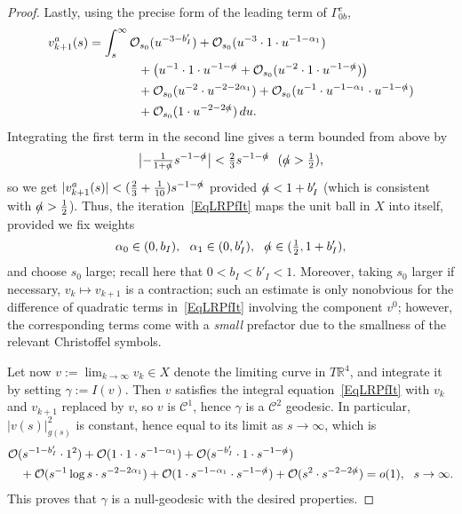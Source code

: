 \documentclass[reqno,11pt,letterpaper]{amsart}
\numberwithin{equation}{section}
\numberwithin{figure}{section}
\theoremstyle{definition}
\theoremstyle{remark}
\newcommand{\mc}{\mathcal}
\newcommand{\cC}{\mc C}
\newcommand{\cO}{\mc O}
\newcommand{\R}{\mathbb{R}}
\newcommand{\slalpha}{\slashed{\alpha}{}}
\newcommand{\half}{\tfrac{1}{2}}
\begin{document}
\begin{proof}
  Lastly, using the precise form of the leading term of $\Gamma_{0 b}^c$,
  \begin{equation}
  \label{EqLRPfVA}
  \begin{split}
    v^a_{k+1}(s) &= \int_s^\infty \cO_{s_0}(u^{-3-b'_I}) + \cO_{s_0}(u^{-3}\cdot 1\cdot u^{-1-\alpha_1}) \\
      &\qquad\qquad + \bigl( u^{-1}\cdot 1\cdot u^{-1-\slalpha} + \cO_{s_0}(u^{-2}\cdot 1\cdot u^{-1-\slalpha}) \bigr) \\
      &\qquad\qquad + \cO_{s_0}(u^{-2}\cdot u^{-2-2\alpha_1}) + \cO_{s_0}(u^{-1}\cdot u^{-1-\alpha_1}\cdot u^{-1-\slalpha}) \\
      &\qquad\qquad + \cO_{s_0}(1\cdot u^{-2-2\slalpha})\,d u.
  \end{split}
  \end{equation}
  Integrating the first term in the second line gives a term bounded from above by
  \[
    \bigl|{-\tfrac{1}{1+\slalpha}}s^{-1-\slalpha}\bigr|<\tfrac23 s^{-1-\slalpha}\ \ (\slalpha>\half),
  \]
  so we get $|v^a_{k+1}(s)|<(\frac{2}{3}+\frac{1}{10})s^{-1-\slalpha}$ provided $\slalpha<1+b'_I$ (which is consistent with $\slalpha>\half$). Thus, the iteration~\eqref{EqLRPfIt} maps the unit ball in $X$ into itself, provided we fix weights
  \begin{equation}
  \label{EqLRPfWeights}
    \alpha_0\in(0,b_I),\ \ 
    \alpha_1\in(0,b'_I),\ \ 
    \slalpha\in(\half,1+b'_I),
  \end{equation}
  and choose $s_0$ large; recall here that $0<b_I<b'_I<1$. Moreover, taking $s_0$ larger if necessary, $v_k\mapsto v_{k+1}$ is a contraction; such an estimate is only nonobvious for the difference of quadratic terms in~\eqref{EqLRPfIt} involving the component $v^0$; however, the corresponding terms come with a \emph{small} prefactor due to the smallness of the relevant Christoffel symbols.

  Let now $v:=\lim_{k\to\infty} v_k\in X$ denote the limiting curve in $T\R^4$, and integrate it by setting $\gamma:=I(v)$. Then $v$ satisfies the integral equation~\eqref{EqLRPfIt} with $v_k$ and $v_{k+1}$ replaced by $v$, so $v$ is $\cC^1$, hence $\gamma$ is a $\cC^2$ geodesic. In particular, $|v(s)|_{g(s)}^2$ is constant, hence equal to its limit as $s\to\infty$, which is
  \begin{align*}
    &\cO(s^{-1-b'_I}\cdot 1^2) + \cO(1\cdot 1\cdot s^{-1-\alpha_1}) + \cO(s^{-b'_I}\cdot 1\cdot s^{-1-\slalpha}) \\
    &\quad + \cO(s^{-1}\log s\cdot s^{-2-2\alpha_1}) + \cO(1\cdot s^{-1-\alpha_1}\cdot s^{-1-\slalpha}) + \cO(s^2\cdot s^{-2-2\slalpha}) = o(1),\ \ s\to\infty.
  \end{align*}
  This proves that $\gamma$ is a null-geodesic with the desired properties.
\end{proof}
\end{document}

